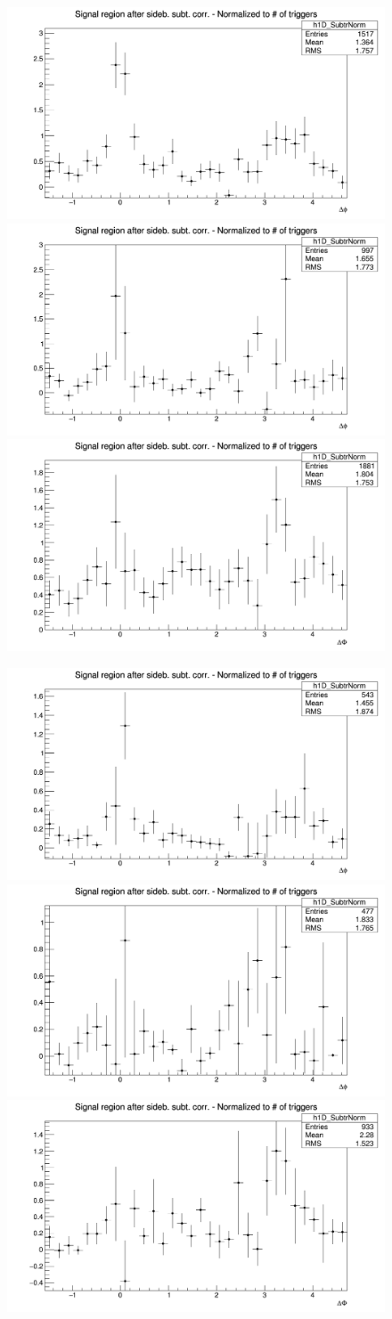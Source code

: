\begin{figure}[!htbp]
{\includegraphics[width=0.31\linewidth, height=0.23\linewidth]{figures/Dzero/AzimCorrDistr_Dzero_Canvas_PtIntBins12to13_PoolInt_thr2dotto99dot.png}}
{\includegraphics[width=0.31\linewidth, height=0.23\linewidth]{figures/DplusPlotsweff/AzimCorrDistr_Dplus_Canvas_PtIntBins13to13_PoolInt_thr2dotto99dot.png}}
{\includegraphics[width=0.31\linewidth, height=0.23\linewidth]{figures/Dstar_wEFF/AzimCorrDistr_Dstar_Canvas_PtIntBins10to10_PoolInt_thr2dotto99dot.png}}

{\includegraphics[width=0.31\linewidth, height=0.23\linewidth]{figures/Dzero/AzimCorrDistr_Dzero_Canvas_PtIntBins12to13_PoolInt_thr3dotto99dot.png}}
{\includegraphics[width=0.31\linewidth, height=0.23\linewidth]{figures/DplusPlotsweff/AzimCorrDistr_Dplus_Canvas_PtIntBins13to13_PoolInt_thr3dotto99dot.png}}
{\includegraphics[width=0.31\linewidth, height=0.23\linewidth]{figures/Dstar_wEFF/AzimCorrDistr_Dstar_Canvas_PtIntBins10to10_PoolInt_thr3dotto99dot.png}}

\end{figure}

